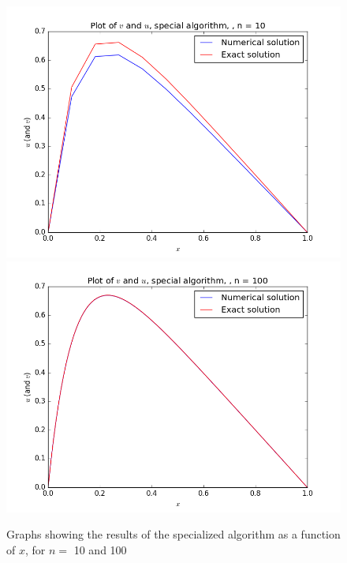 \documentclass[12pt]{article}
\begin{document}
\begin{figure}[hbtp]
\centering
\includegraphics[scale=0.5]{Data_plots/Simplified_data_n10.png}
\includegraphics[scale=0.5]{Data_plots/Simplified_data_n100.png}
\caption{Graphs showing the results of the specialized algorithm as a function of $x$, for $n =$ 10 and 100}
\end{figure}
\end{document}
